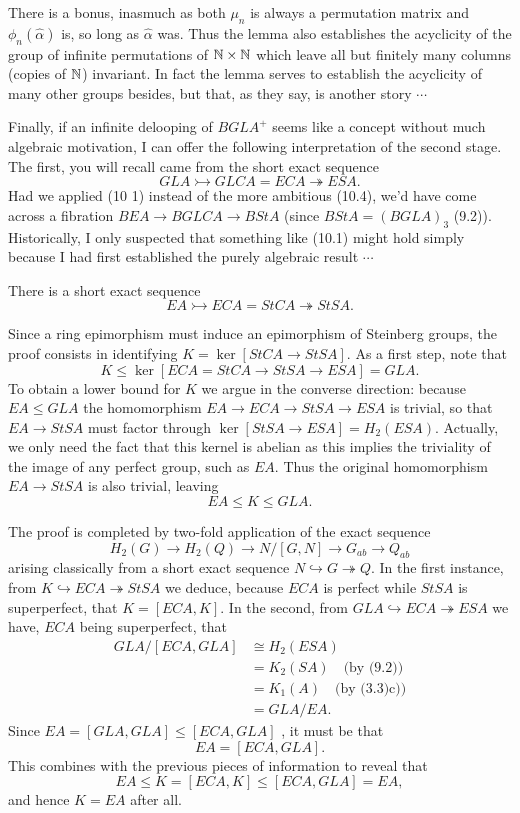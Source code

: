 There is a bonus, inasmuch as both $\mu_n$ is always a permutation matrix and $\phi_n(\hat{\alpha})$ is, so long as $\hat{\alpha}$ was. Thus the lemma also establishes the acyclicity of the group of infinite permutations of $\mathbb{N} \times \mathbb{N}$ which leave all but finitely many columns (copies of $\mathbb{N}$) invariant. In fact the lemma serves to establish the acyclicity of many other groups besides, but that, as they say, is another story $\cdots $

Finally, if an infinite delooping of $BGLA^+$ seems like a concept without much algebraic motivation, I can offer the following interpretation of the second stage. The first, you will recall came from the short exact sequence
\[GLA \rightarrowtail GLCA = ECA\twoheadrightarrow ESA .\]
Had we applied (10 1) instead of the more ambitious (10.4), we'd have come across a fibration $BEA \longrightarrow BGLCA \longrightarrow  BStA$ (since $BStA = (BGLA)_3$ (9.2)). Historically, I only suspected that something like (10.1) might hold simply because I had first established the purely algebraic result $\cdots $

\begin{prop}
  There is a short exact sequence
\[EA \rightarrowtail ECA = StCA \twoheadrightarrow StSA .\]
 \end{prop} 
Since a ring epimorphism must induce an epimorphism of Steinberg groups, the proof consists in identifying $K = \ker [StCA \longrightarrow StSA]$. As a first step, note that
\[K \leqslant \ker [ECA = StCA\longrightarrow StSA\longrightarrow ESA] = GLA.\]
To obtain a lower bound for $K$ we argue in the converse direction: because $EA \leqslant GLA$ the homomorphism $EA\longrightarrow  ECA\longrightarrow StSA \longrightarrow ESA$ is trivial, so that $EA\longrightarrow  StSA$ must factor through $\ker [StSA \longrightarrow ESA] = H_2(ESA)$. Actually, we only need the fact that this kernel is abelian as this implies the triviality of the image of any perfect group, such as $EA$. Thus the original homomorphism $EA \longrightarrow StSA$ is also trivial, leaving
\[EA\leqslant K\leqslant GLA .\]

The proof is completed by two-fold application of the exact sequence 
\[H_2(G) \longrightarrow H_2(Q) \longrightarrow  N/[G, N] \longrightarrow G_{ab} \longrightarrow Q_{ab}\]
arising classically from a short exact sequence $N \hookrightarrow G\twoheadrightarrow Q$. In the first instance, from $K \hookrightarrow  ECA\twoheadrightarrow StSA$ we deduce, because $ECA$ is perfect while $StSA$ is superperfect, that $K = [ECA, K]$. In the second, from $GLA \hookrightarrow ECA\twoheadrightarrow ESA$ we have, $ECA$ being superperfect, that
\begin{align*}
 GLA/[ECA,GLA] & \cong H_2(ESA)\\
 &=K_2(SA) \quad \mbox{(by (9.2))} \\
 &=K_1(A) \quad \mbox{(by (3.3)c))} \\
 &=GLA/EA.
\end{align*}
Since $EA= [GLA, GLA] \leqslant [ECA, GLA]$ , it must be that 
\[EA = [ECA, GLA] .\]
This combines with the previous pieces of information to reveal that 
\[EA\leqslant K = [ECA,K] \leqslant [ECA, GLA] = EA,\]
 and hence $K = EA$ after all.
